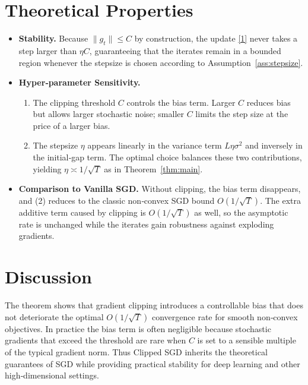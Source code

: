\documentclass{article}
\begin{document}
\section*{Theoretical Properties}
\begin{itemize}
\item \textbf{Stability.} Because $\|g_{t}\|\le C$ by construction, the
update \eqref{1} never takes a step larger than $\eta C$, guaranteeing
that the iterates remain in a bounded region whenever the stepsize is
chosen according to Assumption~\ref{ass:stepsize}.

\item \textbf{Hyper‑parameter Sensitivity.}
  \begin{enumerate}
  \item The clipping threshold $C$ controls the bias term. Larger $C$
        reduces bias but allows larger stochastic noise; smaller $C$
        limits the step size at the price of a larger bias.
  \item The stepsize $\eta$ appears linearly in the variance term
        $L\eta\sigma^{2}$ and inversely in the initial‑gap term.
        The optimal choice balances these two contributions,
        yielding $\eta\asymp1/\sqrt{T}$ as in Theorem~\ref{thm:main}.
  \end{enumerate}

\item \textbf{Comparison to Vanilla SGD.}
  Without clipping, the bias term disappears, and (2) reduces to the classic
  non‑convex SGD bound $O(1/\sqrt{T})$.
  The extra additive term caused by clipping is $O(1/\sqrt{T})$ as well,
  so the asymptotic rate is unchanged while the iterates gain robustness
  against exploding gradients.
\end{itemize}

\section*{Discussion}
The theorem shows that gradient clipping introduces a controllable
bias that does not deteriorate the optimal $O(1/\sqrt{T})$ convergence rate
for smooth non‑convex objectives.  In practice the bias term is often
negligible because stochastic gradients that exceed the threshold are
rare when $C$ is set to a sensible multiple of the typical gradient norm.
Thus Clipped SGD inherits the theoretical guarantees of SGD while
providing practical stability for deep learning and other high‑dimensional
settings.
\end{document}
